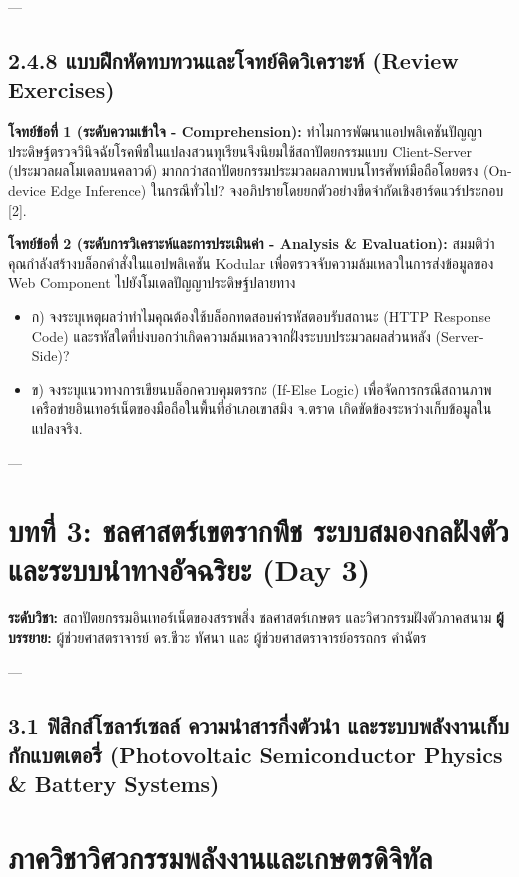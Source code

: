 \documentclass[11pt,a4paper,openany]{report}
\begin{document}
---

\section{2.4.8 แบบฝึกหัดทบทวนและโจทย์คิดวิเคราะห์ (Review Exercises)}


\textbf{โจทย์ข้อที่ 1 (ระดับความเข้าใจ - Comprehension):}
ทำไมการพัฒนาแอปพลิเคชันปัญญาประดิษฐ์ตรวจวินิจฉัยโรคพืชในแปลงสวนทุเรียนจึงนิยมใช้สถาปัตยกรรมแบบ Client-Server (ประมวลผลโมเดลบนคลาวด์) มากกว่าสถาปัตยกรรมประมวลผลภาพบนโทรศัพท์มือถือโดยตรง (On-device Edge Inference) ในกรณีทั่วไป? จงอภิปรายโดยยกตัวอย่างขีดจำกัดเชิงฮาร์ดแวร์ประกอบ [2].

\textbf{โจทย์ข้อที่ 2 (ระดับการวิเคราะห์และการประเมินค่า - Analysis \& Evaluation):}
สมมติว่าคุณกำลังสร้างบล็อกคำสั่งในแอปพลิเคชัน Kodular เพื่อตรวจจับความล้มเหลวในการส่งข้อมูลของ Web Component ไปยังโมเดลปัญญาประดิษฐ์ปลายทาง
\begin{itemize}
  \item ก) จงระบุเหตุผลว่าทำไมคุณต้องใช้บล็อกทดสอบค่ารหัสตอบรับสถานะ (HTTP Response Code) และรหัสใดที่บ่งบอกว่าเกิดความล้มเหลวจากฝั่งระบบประมวลผลส่วนหลัง (Server-Side)?
  \item ข) จงระบุแนวทางการเขียนบล็อกควบคุมตรรกะ (If-Else Logic) เพื่อจัดการกรณีสถานภาพเครือข่ายอินเทอร์เน็ตของมือถือในพื้นที่อําเภอเขาสมิง จ.ตราด เกิดขัดข้องระหว่างเก็บข้อมูลในแปลงจริง.
\end{itemize}




---



\chapter{บทที่ 3: ชลศาสตร์เขตรากพืช ระบบสมองกลฝังตัว และระบบนำทางอัจฉริยะ (Day 3)}


\textbf{ระดับวิชา:} สถาปัตยกรรมอินเทอร์เน็ตของสรรพสิ่ง ชลศาสตร์เกษตร และวิศวกรรมฝังตัวภาคสนาม
\textbf{ผู้บรรยาย:} ผู้ช่วยศาสตราจารย์ ดร.ชีวะ ทัศนา และ ผู้ช่วยศาสตราจารย์อรรถกร คำฉัตร

---

\section{3.1 ฟิสิกส์โซลาร์เซลล์ ความนำสารกึ่งตัวนำ และระบบพลังงานเก็บกักแบตเตอรี่ (Photovoltaic Semiconductor Physics \& Battery Systems)}


\chapter{ภาควิชาวิศวกรรมพลังงานและเกษตรดิจิทัล}
\end{document}
